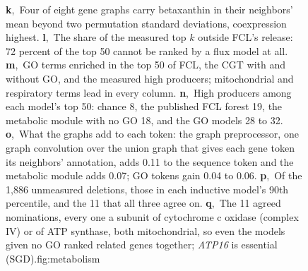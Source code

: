 \begin{figure}[t]
{\textbf{k},~Four of eight gene graphs carry betaxanthin in their neighbors' mean beyond two
permutation standard deviations, coexpression highest.
\textbf{l},~The share of the measured top $k$ outside FCL's release: 72 percent of the top 50
cannot be ranked by a flux model at all.
\textbf{m},~GO terms enriched in the top 50 of FCL, the CGT with and without GO, and the
measured high producers; mitochondrial and respiratory terms lead in every column.
\textbf{n},~High producers among each model's top 50: chance 8, the published FCL forest 19,
the metabolic module with no GO 18, and the GO models 28 to 32.
\textbf{o},~What the graphs add to each token: the graph preprocessor, one graph convolution
over the union graph that gives each gene token its neighbors' annotation, adds 0.11 to the
sequence token and the metabolic module adds 0.07; GO tokens gain 0.04 to 0.06.
\textbf{p},~Of the 1,886 unmeasured deletions, those in each inductive model's 90th percentile,
and the 11 that all three agree on.
\textbf{q},~The 11 agreed nominations, every one a subunit of cytochrome c oxidase (complex IV)
or of ATP synthase, both mitochondrial, so even the models given no GO ranked related genes
together; \textit{ATP16} is essential (SGD).}{fig:metabolism}
\end{figure}
\FloatBarrier

